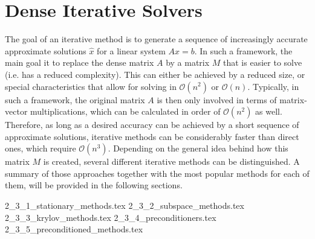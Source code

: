 \section{Dense Iterative Solvers}
\label{sec:iterative_solvers}

The goal of an iterative method is to generate a sequence of increasingly accurate approximate solutions $\hat{x}$ for a linear system $Ax=b$. In such a framework, the main goal it to replace the dense matrix $A$ by a matrix $M$ that is easier to solve (i.e. has a reduced complexity). This can either be achieved by a reduced size, or special characteristics that allow for solving in $\mathcal{O}(n^2)$ or $\mathcal{O}(n)$. Typically, in such a framework, the original matrix $A$ is then only involved in terms of matrix-vector multiplications, which can be calculated in order of $\mathcal{O}(n^2)$ as well. Therefore, as long as a desired accuracy can be achieved by a short sequence of approximate solutions, iterative methods can be considerably faster than direct ones, which require $\mathcal{O}(n^3)$. Depending on the general idea behind how this matrix $M$ is created, several different iterative methods can be distinguished. A summary of those approaches together with the most popular methods for each of them, will be provided in the following sections.

{2_3_1_stationary_methods.tex}
{2_3_2_subspace_methods.tex}
{2_3_3_krylov_methods.tex}
{2_3_4_preconditioners.tex}
{2_3_5_preconditioned_methods.tex}

\newpage

